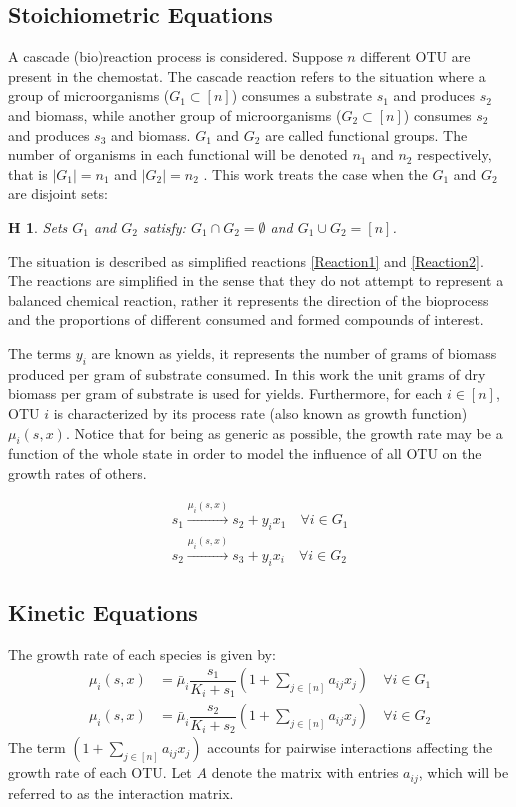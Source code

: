 \documentclass[3p,times]{elsarticle}
\newtheorem{hypo}{H}
\begin{document}
\subsection{Stoichiometric Equations}
A cascade (bio)reaction process is considered. Suppose $n$ different OTU are present in the chemostat. The cascade reaction refers to the situation where a group of microorganisms ($G_1 \subset [n] $) consumes a substrate $s_1$ and produces $s_2$ and biomass, while another group of microorganisms ($G_2\subset [n]$) consumes $s_2$ and produces $s_3$ and biomass. $G_1$ and $G_2$ are called functional groups. The number of organisms in each functional will be denoted $n_1$ and $n_2$ respectively, that is $\vert G_1 \vert = n_1$ and $\vert G_2 \vert = n_2$ . This work treats the case when the $G_1$ and $G_2$ are disjoint sets:

\begin{hypo}  Sets $G_1$ and $G_2$ satisfy: $G_1 \cap G_2 = \emptyset$ and $G_1 \cup G_2 = [n]$. 
\end{hypo}

The situation is described as simplified reactions \eqref{Reaction1} and \eqref{Reaction2}. The reactions are simplified in the sense that they do not attempt to represent a balanced chemical reaction, rather it represents the direction of the bioprocess and the proportions of different consumed and formed compounds of interest. 

The terms $y_i$ are known as yields, it represents the number of grams of biomass produced per gram of substrate consumed. In this work the unit grams of dry biomass per gram of substrate is used for yields. Furthermore, for each $ i \in [n]$, OTU $i$ is characterized by its process rate (also known as growth function) $\mu_i(s,x)$. Notice that for being as generic as possible, the growth rate may be a function of the whole state in order to model the influence of all OTU on the growth rates of others.

\begin{align}
\label{Reaction1} \tag{R G1} 	s_1 \stackrel{\mu_i(s,x)}{\longrightarrow} s_2 + y_ix_1 \quad \forall i \in G_1 \\
\label{Reaction2} \tag{R G2} s_2\stackrel{\mu_i(s,x)}{\longrightarrow} s_3 + y_ix_i \quad \forall i \in G_2
\end{align}

\subsection{Kinetic Equations}
The growth rate of each species is given by:
\begin{align}
\mu_i(s,x) &= \bar{\mu}_i \dfrac{s_1}{K_i + s_1}\left(1+\sum \limits_{j\in [n]} a_{ij} x_{j} \right) \quad \forall i \in G_1 \\
\mu_i(s,x) &= \bar{\mu}_i \dfrac{s_2}{K_i + s_2}\left(1+\sum \limits_{j\in [n]} a_{ij} x_{j} \right) \quad \forall i \in G_2
\end{align}
The term $\left(1+\sum \limits_{j\in [n]} a_{ij} x_{j} \right)$ accounts for pairwise interactions affecting the growth rate of each OTU. Let $A$ denote the matrix
with entries $a_{ij}$, which will be referred to as the interaction matrix.  
\end{document}

